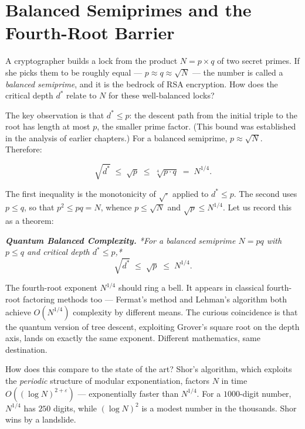 \documentclass[11pt,openright,twoside]{book}
\renewenvironment{quotation}{%
  \par\vspace{8pt}%
  \begin{list}{}{%
    \setlength{\leftmargin}{2em}%
    \setlength{\rightmargin}{2em}%
  }\item[]\itshape\color{pullquote}%
}{%
  \end{list}%
  \par\vspace{8pt}%
}
\theoremstyle{definition}
\begin{document}
\bigskip


\section{Balanced Semiprimes and the Fourth-Root Barrier}

A cryptographer builds a lock from the product $N = p \times q$ of two secret primes. If she picks them to be roughly equal --- $p \approx q \approx \sqrt{N}$ --- the number is called a \textit{balanced semiprime}, and it is the bedrock of RSA encryption. How does the critical depth $d^*$ relate to $N$ for these well-balanced locks?

The key observation is that $d^* \leq p$: the descent path from the initial triple to the root has length at most $p$, the smaller prime factor. (This bound was established in the analysis of earlier chapters.) For a balanced semiprime, $p \approx \sqrt{N}$. Therefore:

\[\sqrt{d^*} \;\leq\; \sqrt{p} \;\leq\; \sqrt[4]{p \cdot q} \;=\; N^{1/4}.\]

The first inequality is the monotonicity of $\sqrt{\cdot}$ applied to $d^* \leq p$. The second uses $p \leq q$, so that $p^2 \leq pq = N$, whence $p \leq \sqrt{N}$ and $\sqrt{p} \leq N^{1/4}$. Let us record this as a theorem:

\begin{quotation}
\noindent\itshape \textbf{Quantum Balanced Complexity.} *For a balanced semiprime $N = pq$ with $p \leq q$ and critical depth $d^* \leq p$,* $$\sqrt{d^*} \;\leq\; \sqrt{p} \;\leq\; N^{1/4}.$$
\end{quotation}

The fourth-root exponent $N^{1/4}$ should ring a bell. It appears in classical fourth-root factoring methods too --- Fermat's method and Lehman's algorithm both achieve $O(N^{1/4})$ complexity by different means. The curious coincidence is that the quantum version of tree descent, exploiting Grover's square root on the depth axis, lands on exactly the same exponent. Different mathematics, same destination.

How does this compare to the state of the art? Shor's algorithm, which exploits the \textit{periodic} structure of modular exponentiation, factors $N$ in time $O((\log N)^{2+\varepsilon})$ --- exponentially faster than $N^{1/4}$. For a $1000$-digit number, $N^{1/4}$ has $250$ digits, while $(\log N)^2$ is a modest number in the thousands. Shor wins by a landslide.
\end{document}
